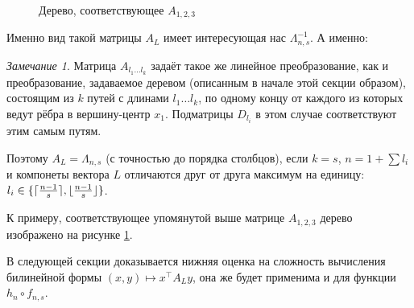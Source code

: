 \documentclass[oneside, a4paper]{article}
\theoremstyle{plain}
\theoremstyle{remark}
\newtheorem{remark}{Замечание}
\DeclarePairedDelimiter\floor{\lfloor}{\rfloor}
\DeclarePairedDelimiter\ceil{\lceil}{\rceil}
\begin{document}
\begin{figure}[h]
\centering
{}
\caption{Дерево, соответствующее $A_{1, 2, 3}$}
\label{fig_last_tree}
\end{figure}

Именно вид такой матрицы $A_L$ имеет интересующая нас $\Lambda_{n, s}^{-1}$. А
именно:

\begin{remark}
Матрица $A_{l_1 \dots l_k}$ задаёт такое же линейное преобразование, как и
преобразование, задаваемое деревом (описанным в начале этой секции образом),
состоящим из $k$ путей с длинами $l_1 \dots l_k$, по одному концу от каждого из
которых ведут рёбра в вершину-центр $x_1$. Подматрицы $D_{l_i}$ в этом случае
соответствуют этим самым путям.
\end{remark}

Поэтому $A_L = \Lambda_{n, s}$ (с точностью до порядка столбцов), если $k = s$,
$n = 1 + \sum l_i$ и компонеты вектора $L$ отличаются друг от друга максимум на
единицу: $l_i \in \{\ceil{\frac {n-1} s}, \floor{\frac {n-1} s}\}$.

К примеру, соответствующее упомянутой выше матрице $A_{1,2,3}$ дерево изображено
на рисунке \ref{fig_last_tree}.

В следующей секции доказывается нижняя оценка на сложность вычисления билинейной
формы $(x, y) \mapsto x^\top A_L y$, она же будет применима и для функции $h_n
\circ f_{n, s}$.
\end{document}
